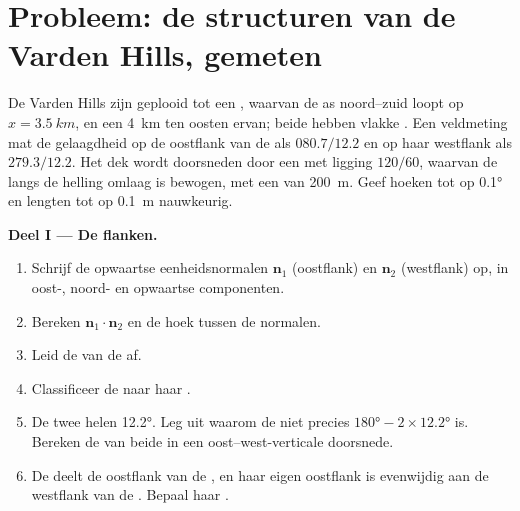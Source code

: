 \section{Probleem: de structuren van de Varden Hills, gemeten}

\begin{problem}
\label{pb:b1:faults-folds-fabrics:1}
De Varden Hills zijn geplooid tot een , waarvan de as noord--zuid loopt op $x = \qty{3.5}{km}$, en een  \qty{4}{km} ten oosten ervan; beide hebben vlakke . Een veldmeting mat de gelaagdheid op de oostflank van de  als $080.7/12.2$ en op haar westflank als $279.3/12.2$. Het dek wordt doorsneden door een  met ligging $120/60$, waarvan de  langs de helling omlaag is bewogen, met een  van \qty{200}{m}. Geef hoeken tot op \ang{0.1} en lengten tot op \qty{0.1}{m} nauwkeurig.

\medskip
\noindent\textbf{Deel I --- De flanken.}
\begin{enumerate}
  \item Schrijf de opwaartse eenheidsnormalen $\mathbf n_1$ (oostflank) en
        $\mathbf n_2$ (westflank) op, in oost-, noord- en opwaartse componenten.
  \item Bereken $\mathbf n_1\cdot\mathbf n_2$ en de hoek tussen de normalen.
  \item Leid de  van de  af.
  \item Classificeer de  naar haar .
  \item De twee  helen \ang{12.2}. Leg uit waarom de  niet precies $\ang{180} - 2\times\ang{12.2}$ is. Bereken de  van beide  in een oost--west-verticale doorsnede.
  \item De  deelt de oostflank van de , en haar eigen oostflank is evenwijdig aan de westflank van de . Bepaal haar .
\end{enumerate}


\end{problem}
